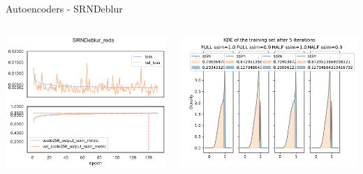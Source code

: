 \documentclass{beamer}
\begin{document}
\begin{frame}{Autoencoders - SRNDeblur\cite{SRN-DeblurNet}}
{\begin{columns}
\begin{column}[c]{0.35\paperwidth}
                \includegraphics[width=0.3\paperheight,keepaspectratio]{srndeblur/plot_history_SRNDeblur_reds.pdf}
            \end{column}
            \begin{column}[c]{0.50\paperwidth}
                \includegraphics[width=0.45\paperwidth,keepaspectratio]{srndeblur/kde.pdf}
            \end{column}
        \end{columns}

    }


\end{frame}
\end{document}
